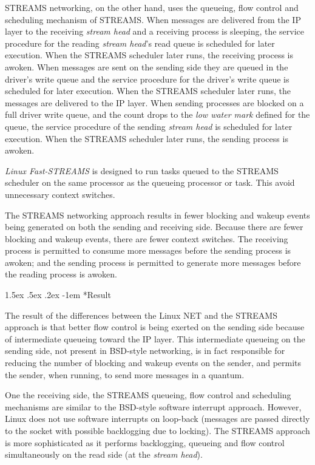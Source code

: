 \documentclass[letterpaper,final,notitlepage,twocolumn,10pt,twoside]{article}
\makeatletter
\renewcommand\paragraph{\@startsection{paragraph}{4}{\z@}%
                                    {1.5ex \@plus .5ex \@minus .2ex}%
                                    {-1em}%
                                    {\normalfont\normalsize\bfseries\slshape}}
\makeatother
\begin{document}
STREAMS networking, on the other hand, uses the queueing, flow control and scheduling mechanism of
STREAMS.  When messages are delivered from the IP layer to the receiving \textit{stream head} and a
receiving process is sleeping, the service procedure for the reading \textit{stream head}'s read
queue is scheduled for later execution.  When the STREAMS scheduler later runs, the receiving
process is awoken.  When messages are sent on the sending side they are queued in the driver's write
queue and the service procedure for the driver's write queue is scheduled for later execution.  When
the STREAMS scheduler later runs, the messages are delivered to the IP layer.  When sending
processes are blocked on a full driver write queue, and the count drops to the \textit{low water
mark} defined for the queue, the service procedure of the sending \textit{stream head} is scheduled
for later execution.  When the STREAMS scheduler later runs, the sending process is awoken.

\textsl{Linux Fast-STREAMS} is designed to run tasks queued to the STREAMS scheduler on the same
processor as the queueing processor or task.  This avoid unnecessary context switches.

The STREAMS networking approach results in fewer blocking and wakeup events being generated on both
the sending and receiving side.  Because there are fewer blocking and wakeup events, there are fewer
context switches.  The receiving process is permitted to consume more messages before the sending
process is awoken; and the sending process is permitted to generate more messages before the reading
process is awoken.

\paragraph*{Result}

The result of the differences between the Linux NET and the STREAMS approach is that better flow
control is being exerted on the sending side because of intermediate queueing toward the IP layer.
This intermediate queueing on the sending side, not present in BSD-style networking, is in fact
responsible for reducing the number of blocking and wakeup events on the sender, and permits the
sender, when running, to send more messages in a quantum.

One the receiving side, the STREAMS queueing, flow control and scheduling mechanisms are similar to
the BSD-style software interrupt approach.  However, Linux does not use software interrupts on
loop-back (messages are passed directly to the socket with possible backlogging due to locking).
The STREAMS approach is more sophisticated as it performs backlogging, queueing and flow control
simultaneously on the read side (at the \textit{stream head}).
\end{document}
